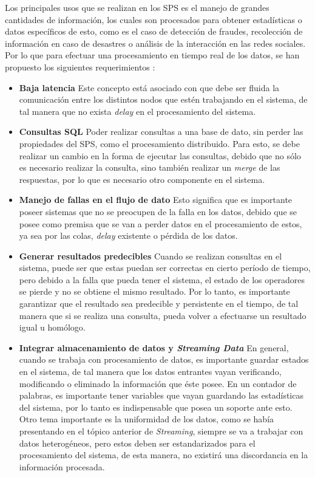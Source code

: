 Los principales usos que se realizan en los SPS es el manejo de grandes cantidades de información, los cuales son procesados para obtener estadísticas o datos específicos de esto, como es el caso de detección de fraudes, recolección de información en caso de desastres o análisis de la interacción en las redes sociales. Por lo que para efectuar una procesamiento en tiempo real de los datos, se han propuesto los siguientes requerimientos \citep{StonebrakerCZ05}:

\begin{itemize}
	\item \textbf{Baja latencia} Este concepto está asociado con que debe ser fluida la comunicación entre los distintos nodos que estén trabajando en el sistema, de tal manera que no exista \textit{delay} en el procesamiento del sistema.
	\item \textbf{Consultas SQL} Poder realizar consultas a una base de dato, sin perder las propiedades del SPS, como el procesamiento distribuido. Para esto, se debe realizar un cambio en la forma de ejecutar las consultas, debido que no sólo es necesario realizar la consulta, sino también realizar un \textit{merge} de las respuestas, por lo que es necesario otro componente en el sistema.
	\item \textbf{Manejo de fallas en el flujo de dato} Esto significa que es importante poseer sistemas que no se preocupen de la falla en los datos, debido que se posee como premisa que se van a perder datos en el procesamiento de estos, ya sea por las colas, \textit{delay} existente o pérdida de los datos.
	\item \textbf{Generar resultados predecibles} Cuando se realizan consultas en el sistema, puede ser que estas puedan ser correctas en cierto período de tiempo, pero debido a la falla que pueda tener el sistema, el estado de los operadores se pierde y no se obtiene el mismo resultado. Por lo tanto, es importante garantizar que el resultado sea predecible y persistente en el tiempo, de tal manera que si se realiza una consulta, pueda volver a efectuarse un resultado igual u homólogo.
	\item \textbf{Integrar almacenamiento de datos y \textit{Streaming Data}} En general, cuando se trabaja con procesamiento de datos, es importante guardar estados en el sistema, de tal manera que los datos entrantes vayan verificando, modificando o eliminado la información que éste posee. En un contador de palabras, es importante tener variables que vayan guardando las estadísticas del sistema, por lo tanto es indispensable que posea un soporte ante esto. Otro tema importante es la uniformidad de los datos, como se había presentando en el tópico anterior de \textit{Streaming}, siempre se va a trabajar con datos heterogéneos, pero estos deben ser estandarizados para el procesamiento del sistema, de esta manera, no existirá una discordancia en la información procesada.

\end{itemize}
